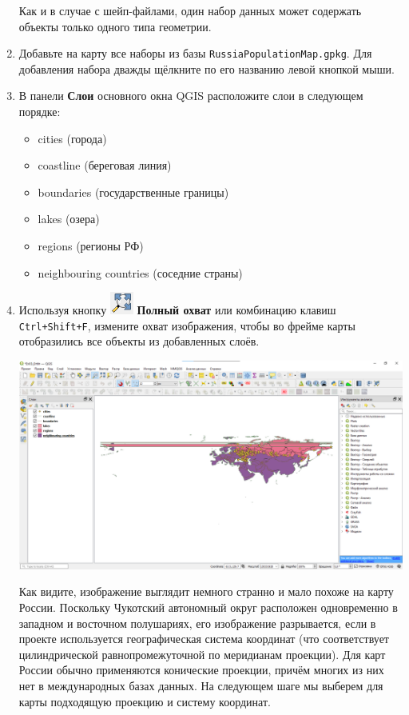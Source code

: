 \documentclass[
  12pt,
]{book}
\providecommand{\tightlist}{%
  \setlength{\itemsep}{0pt}\setlength{\parskip}{0pt}}
\begin{document}
\begin{enumerate}
  Как и в случае с шейп-файлами, один набор данных может содержать объекты только одного типа геометрии.
\item
  Добавьте на карту все наборы из базы \texttt{RussiaPopulationMap.gpkg}. Для добавления набора дважды щёлкните по его названию левой кнопкой мыши.
\item
  В панели \textbf{Слои} основного окна QGIS расположите слои в следующем порядке:

  \begin{itemize}
  \tightlist
  \item
    cities (города)
  \item
    coastline (береговая линия)
  \item
    boundaries (государственные границы)
  \item
    lakes (озера)
  \item
    regions (регионы РФ)
  \item
    neighbouring countries (соседние страны)
  \end{itemize}
\item
  Используя кнопку \includegraphics{images/Ex03/full_extent.png} \textbf{Полный охват} или комбинацию клавиш \texttt{Ctrl+Shift+F}, измените охват изображения, чтобы во фрейме карты отобразились все объекты из добавленных слоёв.

  \includegraphics{images/Ex03/FullExtent_WGS84.png}

  Как видите, изображение выглядит немного странно и мало похоже на карту России. Поскольку Чукотский автономный округ расположен одновременно в западном и восточном полушариях, его изображение разрывается, если в проекте используется географическая система координат (что соответствует цилиндрической равнопромежуточной по меридианам проекции). Для карт России обычно применяются конические проекции, причём многих из них нет в международных базах данных. На следующем шаге мы выберем для карты подходящую проекцию и систему координат.
\end{enumerate}
\end{document}
